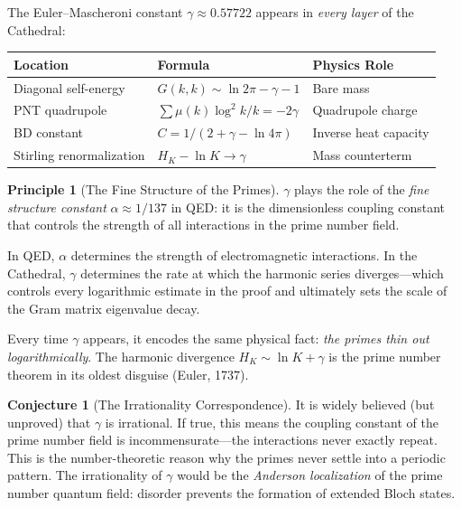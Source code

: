 \documentclass[11pt,a4paper]{article}
\theoremstyle{definition}
\newtheorem{principle}[observation]{Principle}
\newtheorem{conjecture}[observation]{Conjecture}
\begin{document}
The Euler--Mascheroni constant $\gamma \approx 0.57722$ appears in
\emph{every layer} of the Cathedral:

\begin{center}
\begin{tabular}{@{}lll@{}}
\toprule
\textbf{Location} & \textbf{Formula} & \textbf{Physics Role} \\
\midrule
Diagonal self-energy & $G(k,k) \sim \ln 2\pi - \gamma - 1$
  & Bare mass \\
PNT quadrupole & $\sum \mu(k)\log^2 k / k = -2\gamma$
  & Quadrupole charge \\
BD constant & $C = 1/(2 + \gamma - \ln 4\pi)$
  & Inverse heat capacity \\
Stirling renormalization & $H_K - \ln K \to \gamma$
  & Mass counterterm \\
\bottomrule
\end{tabular}
\end{center}

\begin{principle}[The Fine Structure of the Primes]
$\gamma$ plays the role of the \emph{fine structure constant}
$\alpha \approx 1/137$ in QED: it is the dimensionless coupling
constant that controls the strength of all interactions in the
prime number field.

In QED, $\alpha$ determines the strength of electromagnetic
interactions. In the Cathedral, $\gamma$ determines the rate at
which the harmonic series diverges---which controls every
logarithmic estimate in the proof and ultimately sets the scale of
the Gram matrix eigenvalue decay.

Every time $\gamma$ appears, it encodes the same physical fact:
\emph{the primes thin out logarithmically}. The harmonic divergence
$H_K \sim \ln K + \gamma$ is the prime number theorem in its oldest
disguise (Euler, 1737).
\end{principle}

\begin{conjecture}[The Irrationality Correspondence]
It is widely believed (but unproved) that $\gamma$ is irrational.
If true, this means the coupling constant of the prime number field
is incommensurate---the interactions never exactly repeat. This is
the number-theoretic reason why the primes never settle into a
periodic pattern. The irrationality of $\gamma$ would be the
\emph{Anderson localization} of the prime number quantum field:
disorder prevents the formation of extended Bloch states.
\end{conjecture}
\end{document}
